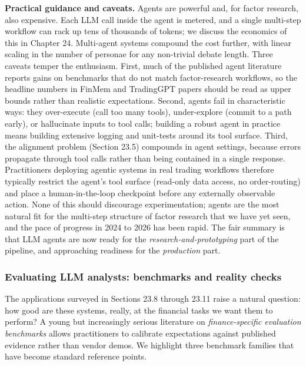 \textbf{Practical guidance and caveats.} Agents are powerful and, for factor research, also expensive. Each LLM call inside the agent is metered, and a single multi-step workflow can rack up tens of thousands of tokens; we discuss the economics of this in Chapter 24. Multi-agent systems compound the cost further, with linear scaling in the number of personae for any non-trivial debate length. Three caveats temper the enthusiasm. First, much of the published agent literature reports gains on benchmarks that do not match factor-research workflows, so the headline numbers in FinMem and TradingGPT papers should be read as upper bounds rather than realistic expectations. Second, agents fail in characteristic ways: they over-execute (call too many tools), under-explore (commit to a path early), or hallucinate inputs to tool calls; building a robust agent in practice means building extensive logging and unit-tests around its tool surface. Third, the alignment problem (Section 23.5) compounds in agent settings, because errors propagate through tool calls rather than being contained in a single response. Practitioners deploying agentic systems in real trading workflows therefore typically restrict the agent's tool surface (read-only data access, no order-routing) and place a human-in-the-loop checkpoint before any externally observable action. None of this should discourage experimentation; agents are the most natural fit for the multi-step structure of factor research that we have yet seen, and the pace of progress in 2024 to 2026 has been rapid. The fair summary is that LLM agents are now ready for the \textit{research-and-prototyping} part of the pipeline, and approaching readiness for the \textit{production} part.

\subsubsection{Evaluating LLM analysts: benchmarks and reality checks}

The applications surveyed in Sections 23.8 through 23.11 raise a natural question: how good are these systems, really, at the financial tasks we want them to perform? A young but increasingly serious literature on \textit{finance-specific evaluation benchmarks} allows practitioners to calibrate expectations against published evidence rather than vendor demos. We highlight three benchmark families that have become standard reference points.

